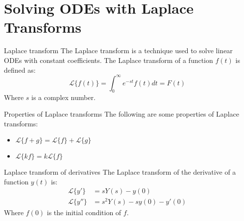 \section{Solving ODEs with Laplace Transforms}
\begin{definition}
    {Laplace transform}
    The Laplace transform is a technique used to solve linear ODEs with constant coefficients. The Laplace transform of a function $f(t)$ is defined as:
    \[\mathcal{L}\{f(t)\}=\int_{0}^{\infty}e^{-st}f(t)dt=F(t)\]
    Where $s$ is a complex number.
\end{definition}

\begin{minipage}{0.52\textwidth}
    \begin{theorem}
        {Properties of Laplace transforms}
        The following are some properties of Laplace transforms:
        \begin{itemize}
            \item $\mathcal{L}\{f+g\} = \mathcal{L}\{f\}+\mathcal{L}\{g\}$
            \item $\mathcal{L}\{kf\} = k\mathcal{L}\{f\}$
        \end{itemize}
    \end{theorem}

    \begin{theorem}
        {Laplace transform of derivatives}
        The Laplace transform of the derivative of a function $y(t)$ is:
        \begin{align*}
            \mathcal{L}\{y'\}  & =sY(s)-y(0)          \\
            \mathcal{L}\{y''\} & =s^2Y(s)-sy(0)-y'(0)
        \end{align*}
        Where $f(0)$ is the initial condition of $f$.
    \end{theorem}

\end{minipage}
\hfill
